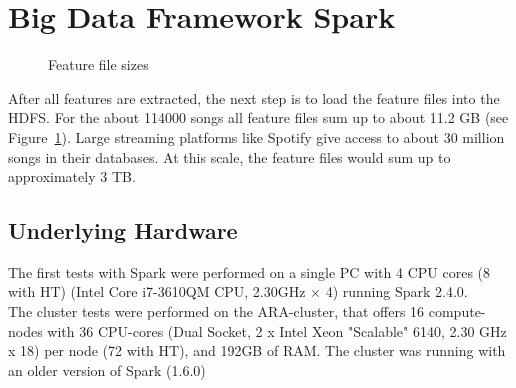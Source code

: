 \section{Big Data Framework Spark}\label{bds1}

\begin{figure}[htbp]
	\centering
	\caption{Feature file sizes}
	\label{filesize}
\end{figure}

\noindent After all features are extracted, the next step is to load the feature files into the HDFS.
For the about 114000 songs all feature files sum up to about 11.2 GB (see Figure~\ref{filesize}). 
\noindent Large streaming platforms like Spotify give access to about 30 million songs in their databases. At this scale, the feature files would sum up to approximately 3 TB.\\

\subsection{Underlying Hardware}

The first tests with Spark were performed on a single PC with 4 CPU cores (8 with HT) (Intel Core i7-3610QM CPU, 2.30GHz × 4) running Spark 2.4.0.\\ The cluster tests were performed on the ARA-cluster, that offers 16 compute-nodes with 36 CPU-cores (Dual Socket, 2 x Intel Xeon "Scalable" 6140, 2.30 GHz x 18) per node (72 with HT), and 192GB of RAM. The cluster was running with an older version of Spark (1.6.0)\\

